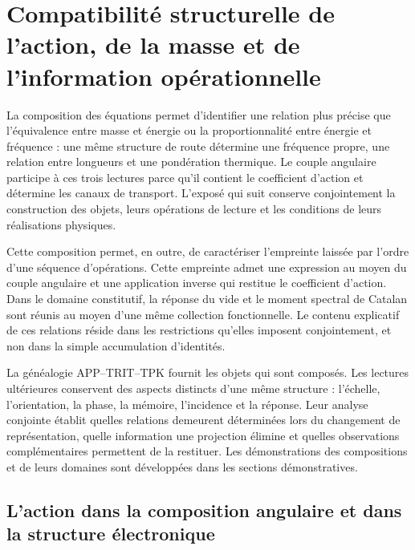 \section{Compatibilité structurelle de l’action, de la masse et de l’information opérationnelle}
\label{sec:narrativa-estructural}

La composition des équations permet d’identifier une relation plus précise
que l’équivalence entre masse et énergie ou la proportionnalité entre énergie
et fréquence : une même structure de route détermine une fréquence propre,
une relation entre longueurs et une pondération thermique. Le couple angulaire
participe à ces trois lectures parce qu’il contient le coefficient d’action et
détermine les canaux de transport. L’exposé qui suit conserve
conjointement la construction des objets, leurs opérations de lecture et
les conditions de leurs réalisations physiques.

Cette composition permet, en outre, de caractériser l’empreinte laissée par l’ordre
d’une séquence d’opérations. Cette empreinte admet une expression au moyen
du couple angulaire et une application inverse qui restitue le coefficient
d’action. Dans le domaine constitutif, la réponse du vide et le moment
spectral de Catalan sont réunis au moyen d’une même collection fonctionnelle. Le
contenu explicatif de ces relations réside dans les restrictions qu’elles
imposent conjointement, et non dans la simple accumulation d’identités.

La généalogie APP--TRIT--TPK fournit les objets qui sont composés. Les
lectures ultérieures conservent des aspects distincts d’une même structure :
l’échelle, l’orientation, la phase, la mémoire, l’incidence et la réponse. Leur analyse
conjointe établit quelles relations demeurent déterminées lors du changement de
représentation, quelle information une projection élimine et quelles observations
complémentaires permettent de la restituer. Les démonstrations des compositions
et de leurs domaines sont développées dans les sections démonstratives.

\subsection{L’action dans la composition angulaire et dans la structure électronique}
\label{subsec:narrativa-accion-angular}

